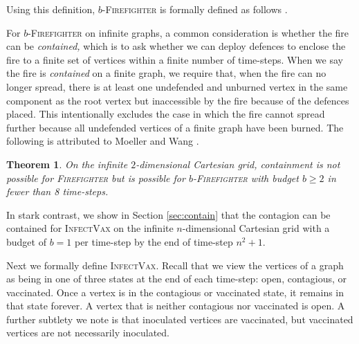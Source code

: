 \documentclass[unknownkeysallowed]{article}
\makeatletter
\newtheorem{theorem}{Theorem}[section]
\theoremstyle{definition}\newtheorem{strategy}{Strategy}
\theoremstyle{definition}\newtheorem{notation}{Notation}[theorem]
\newcommand{\name}[1]{\gdef\@name{#1}}%
\newcommand{\instance}[1]{\gdef\@instance{#1}}%
\newcommand{\question}[1]{\gdef\@question{#1}}%
\newcommand*{\Fire}{\textup{\textsc{Firefighter}}\xspace} %
\newcommand*{\bFire}{$b$-\Fire} %
\newcommand*{\IV}{\textup{\textsc{InfectVax}}\xspace}
\makeatother
\begin{document}
Using this definition, \bFire is formally defined as follows \cite{bazgan_2013}. 

\begin{problem}
    \name{\bFire}
      \instance{A rooted graph $(G,r)$, an integer budget $b\geq 1$ and an integer $k\geq 1$.}
      \question{Is there a strategy $\sigma$ such that if the fire breaks out at $r$:
    \begin{itemize}[nosep]
        \item for each $\sigma_i\in \sigma$, by time $i$ each vertex in $\sigma_i$ is neither burning nor defended,
        \item the number of vertices defended in each time-step is at most $b$,
        \item after time $|\sigma|$, no open vertex is adjacent to a burning vertex, and
        \item at time $|\sigma|$, at least $k$ vertices are saved by implementing $\sigma$?
    \end{itemize}}
\end{problem}

For \bFire on infinite graphs, a common consideration is whether the fire can be \emph{contained,} which is to ask whether we can deploy defences to enclose the fire to a finite set of vertices within a finite number of time-steps. 
When we say the fire is \emph{contained} on a finite graph, we require that, when the fire can no longer spread, there is at least one undefended and unburned vertex in the same component as the root vertex but inaccessible by the fire because of the defences placed. This intentionally excludes the case in which the fire cannot spread further because all undefended vertices of a finite graph have been burned.  The following is attributed to Moeller and Wang \cite{moeller_2002}.
\begin{theorem}\label{thm:fire-contain-cartesian}
    On the infinite $2$-dimensional Cartesian grid, containment is not possible for \Fire but is possible for \bFire with budget $b\geq 2$ in fewer than 8 time-steps.
\end{theorem} 

In stark contrast, we show in Section \ref{sec:contain} that the contagion can be contained for \IV on the infinite $n$-dimensional Cartesian grid with a budget of $b=1$ per time-step by the end of time-step $n^2+1$.

Next we formally define \IV.  Recall that we view the vertices of a graph as being in one of three states at the end of each time-step: open, contagious, or vaccinated.  Once a vertex is in the contagious or vaccinated state, it remains in that state forever.  A vertex that is neither contagious nor vaccinated is open.  A further subtlety we note is that inoculated vertices are vaccinated, but vaccinated vertices are not necessarily inoculated.
\end{document}
